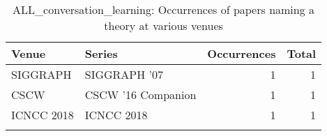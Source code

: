 \begin{table*}[t]
\begin{tabular}{llrr}
Venue & Series & Occurrences & Total\\\hline
\multirow{1}{*}{SIGGRAPH } & SIGGRAPH '07 & 1 & \multirow{1}{*}{1}\\
\multirow{1}{*}{CSCW } & CSCW '16 Companion & 1 & \multirow{1}{*}{1}\\
\multirow{1}{*}{ICNCC 2018} & ICNCC 2018 & 1 & \multirow{1}{*}{1}\\
\caption{ALL_conversation_learning: Occurrences of papers naming a theory at various venues}
\end{tabular}
\end{table*}